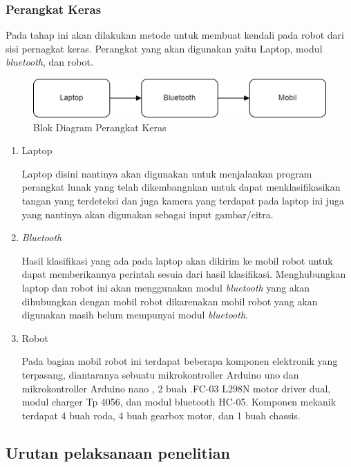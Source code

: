 \subsubsection{Perangkat Keras}
Pada tahap ini akan dilakukan metode untuk membuat kendali pada robot dari sisi pernagkat keras. Perangkat yang akan digunakan yaitu Laptop, modul \textit{bluetooth}, dan robot. 
\begin{figure}[!h]
	\centering
	\includegraphics[width=0.7\linewidth]{"gambar/gambar perangkat keras"}
	\caption{Blok Diagram Perangkat Keras}
	\label{fig:gambar33}
\end{figure}

\begin{enumerate}
  \item Laptop \par
  Laptop disini nantinya akan digunakan untuk menjalankan program perangkat lunak yang telah dikembangnkan untuk dapat menklasifikasikan tangan yang terdeteksi dan juga kamera yang terdapat pada laptop ini juga yang nantinya akan digunakan sebagai input gambar/citra.

  \item \textit{Bluetooth} \par
  Hasil klasifikasi yang ada pada laptop akan dikirim ke mobil robot untuk dapat memberikannya perintah sesuia dari hasil klasifikasi. Menghubungkan laptop dan robot ini akan menggunakan modul \textit{bluetooth} yang akan dihubungkan dengan mobil robot dikarenakan mobil robot yang akan digunakan masih belum mempunyai modul \textit{bluetooth}. 

  \item Robot \par
  Pada bagian mobil robot ini terdapat beberapa komponen elektronik yang terpasang, diantaranya sebuatu mikrokontroller Arduino uno dan mikrokontroller Arduino nano , 2 buah .FC-03 L298N motor driver dual, modul charger Tp 4056, dan modul bluetooth HC-05. Komponen mekanik terdapat 4 buah roda, 4 buah gearbox motor, dan 1 buah chassis.
\end{enumerate}

\subsection{Urutan pelaksanaan penelitian}

